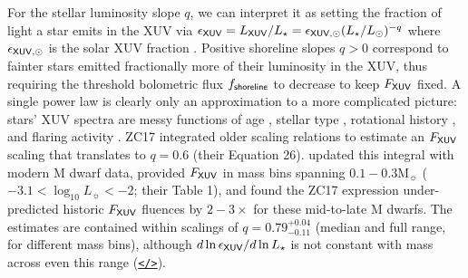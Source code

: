 \documentclass[modern,linenumbers,trackchanges]{aastex7}
\begin{document}
For the stellar luminosity slope $q$, we can interpret it as setting the fraction of light a star emits in the XUV via $\epsilon_{\sf XUV} = L_{\sf XUV}/L_{\star} = \epsilon_{\sf XUV, \odot} (L_\star/L_\odot)^{-q}$ where $\epsilon_{\sf XUV, \odot}$ is the solar XUV fraction \citep[$2\times10^{-6}$ for the quiet Sun and higher when integrated over its lifetime][]{ woodsSolarIrradianceReference2009a, franceMUSCLESTreasurySurvey2016}. Positive shoreline slopes $q > 0$ correspond to fainter stars emitted fractionally more of their luminosity in the XUV, thus requiring the threshold bolometric flux $f_{\sf shoreline}$ to decrease to keep $F_{\sf XUV}$ fixed. A single power law is clearly only an approximation to a more complicated picture: stars' XUV spectra are messy functions of age \citep{ribasEvolutionSolarActivity2005, wrightSTELLARACTIVITYROTATIONRELATIONSHIPEVOLUTION2011, pinedaFarUltravioletMdwarf2021, duvvuriHighenergySpectrumYoung2023b, kingStellarXRayVariability2025}, stellar type \citep{linskyIntrinsicExtremeUltraviolet2014, richey-yowellHAZMATUltravioletXRay2019, peacockHAZMATVIEvolution2020, wilsonMegaMUSCLESTreasurySurvey2025b}, rotational history \citep{irwinMonitorProjectRotation2007, loydHAZMATVIIEvolution2021, johnstoneActiveLivesStars2021}, and flaring activity  \citep{franceHighenergyRadiationEnvironment2020d, diamond-loweHighenergySpectrumNearby2021a, feinsteinAUMicroscopiiFarUV2022a}. ZC17 integrated older scaling relations to estimate an $F_{\sf XUV}$ scaling that translates to $q=0.6$ (their Equation 26). \citet{passRecedingCosmicShoreline2025} updated this integral with modern M dwarf data, provided $F_{\sf XUV}$ in mass bins spanning $0.1-0.3 \mathrm{M_\sun}$ ($-3.1< \log_{10} L_\sun < -2$; their Table 1), and found the ZC17 expression under-predicted historic $F_{\sf XUV}$ fluences by $2-3\times$ for these mid-to-late M dwarfs. The \citet{passRecedingCosmicShoreline2025} estimates are contained within scalings of $q={0.79}^{+0.04}_{-0.11}$ (median and full range, for different mass bins), although $d\ln \epsilon_{\sf XUV}/d\ln L_\star$ is not constant with mass across even this range (\href{https://github.com/zkbt/shoreline/blob/main/notebooks/pass-xuv-comparison.ipynb}{\texttt{</>}}).
\end{document}
